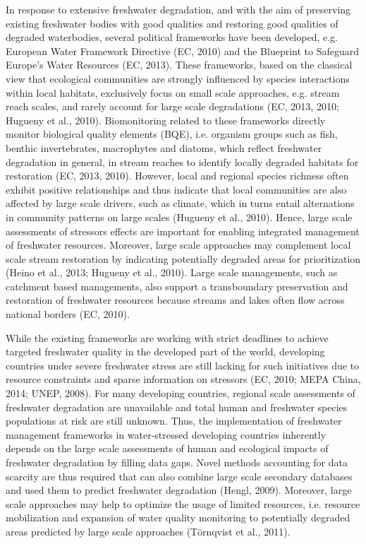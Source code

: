 In response to extensive freshwater degradation, and with the aim of preserving existing freshwater bodies with good qualities and restoring good qualities of degraded waterbodies, several political frameworks have been developed, e.g. European Water Framework Directive (EC, 2010) and the Blueprint to Safeguard Europe’s Water Resources (EC, 2013). These frameworks, based on the classical view that ecological communities are strongly influenced by species interactions within local habitats, exclusively focus on small scale approaches, e.g. stream reach scales, and rarely account for large scale degradations (EC, 2013, 2010; Hugueny et al., 2010). Biomonitoring related to these frameworks directly monitor biological quality elements (BQE), i.e. organism groups such as fish, benthic invertebrates, macrophytes and diatoms, which reflect freshwater degradation in general, in stream reaches to identify locally degraded habitats for restoration (EC, 2013, 2010). However, local and regional species richness often exhibit positive relationships and thus indicate that local communities are also affected by large scale drivers, such as climate, which in turns entail alternations in community patterns on large scales (Hugueny et al., 2010). Hence, large scale assessments of stressors effects are important for enabling integrated management of freshwater resources. Moreover, large scale approaches may complement local scale stream restoration by indicating potentially degraded areas for prioritization (Heino et al., 2013; Hugueny et al., 2010). Large scale managements, such as catchment based managements, also support a transboundary preservation and restoration of freshwater resources because streams and lakes often flow across national borders (EC, 2010).

While the existing frameworks are working with strict deadlines to achieve targeted freshwater quality in the developed part of the world, developing countries under severe freshwater stress are still lacking for such initiatives due to resource constraints and sparse information on stressors (EC, 2010; MEPA China, 2014; UNEP, 2008). For many developing countries, regional scale assessments of freshwater degradation are unavailable and total human and freshwater species populations at risk are still unknown. Thus, the implementation of freshwater management frameworks in water-stressed developing countries inherently depends on the large scale assessments of human and ecological impacts of freshwater degradation by filling data gaps. Novel methods accounting for data scarcity are thus required that can also combine large scale secondary databases and used them to predict freshwater degradation (Hengl, 2009). Moreover, large scale approaches may help to optimize the usage of limited resources, i.e. resource mobilization and expansion of water quality monitoring to potentially degraded areas predicted by large scale approaches (Törnqvist et al., 2011).

